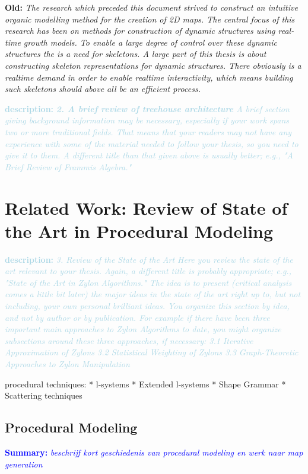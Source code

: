 \documentclass{article}
\newcommand{\inhoud}[1]{\textcolor{blue}{\textbf{\newline Summary: }\it{#1}}}
\newcommand{\old}[1]{\textcolor{myGrey}{\small{\textbf{\newline Old: }\it{#1}}}}
\newcommand{\desc}[1]{\textcolor{lightblue}{\textbf{\newline description: }\it{#1} \newline}}
\begin{document}
\old{   
The research which preceded this document strived to construct an intuitive organic modelling method for the creation of 2D maps. The central focus of this research has been on methods for construction of dynamic structures using real-time growth models. To enable a large degree of control over these dynamic structures the is a need for skeletons. A large part of this thesis is about constructing skeleton representations for dynamic structures. There obviously is a realtime demand in order to enable realtime interactivity, which means building such skeletons should above all be an efficient process.    
}

\desc{\textbf{2. A brief review of treehouse architecture}
A brief section giving background information may be necessary, especially if your work spans two or more traditional fields. That means that your readers may not have any experience with some of the material needed to follow your thesis, so you need to give it to them. A different title than that given above is usually better; e.g., "A Brief Review of Frammis Algebra." 
}


\section{Related Work: Review of State of the Art in Procedural Modeling}

\cite{ Lipp08}
\cite{Chen08}
\cite{Deussen98}
\cite{Muller06}
\cite{Wonka03}
\cite{citysurvey}



\desc{
3. Review of the State of the Art
Here you review the state of the art relevant to your thesis. Again, a different title is probably appropriate; e.g., "State of the Art in Zylon Algorithms." The idea is to present (critical analysis comes a little bit later) the major ideas in the state of the art right up to, but not including, your own personal brilliant ideas.
You organize this section by idea, and not by author or by publication. For example if there have been three important main approaches to Zylon Algorithms to date, you might organize subsections around these three approaches, if necessary:
3.1 Iterative Approximation of Zylons
3.2 Statistical Weighting of Zylons
3.3 Graph-Theoretic Approaches to Zylon Manipulation 
}

procedural techniques: 
* l-systems
* Extended l-systems
* Shape Grammar
* Scattering techniques

\subsection{Procedural Modeling}
\inhoud{beschrijf kort geschiedenis van procedural modeling en werk naar map generation}
\end{document}
